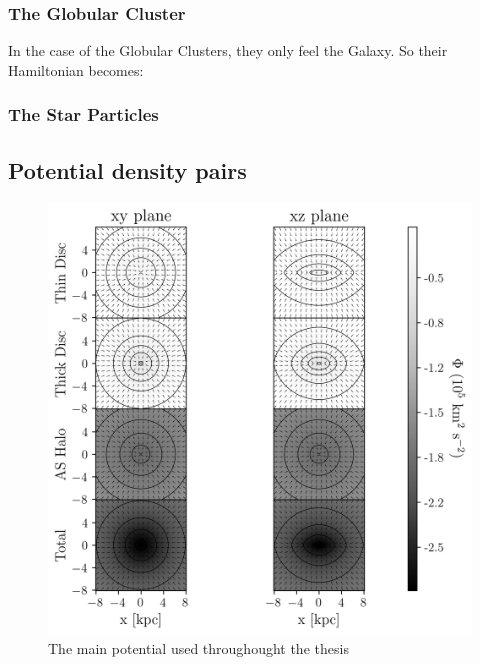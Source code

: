         \subsubsection*{The Globular Cluster}
            In the case of the Globular Clusters, they only feel the Galaxy. So their Hamiltonian becomes: 


        \subsubsection*{The Star Particles}

    \subsection{Potential density pairs}

        \begin{figure}
            \centering
            \includegraphics[width=\linewidth]{images/figure_pouliasis2017pii_potential_-8_8.png}
            \caption{The main potential used throughought the thesis}
        \end{figure}        
    

